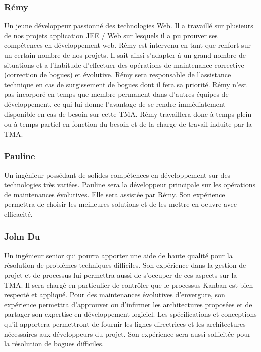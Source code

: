 \subsubsection{Rémy }
Un jeune développeur passionné des technologies Web. Il a travaillé sur plusieurs de nos projets application JEE / Web sur lesquels il a pu prouver ses compétences en développement web. Rémy est intervenu en tant que renfort sur un certain nombre de nos projets. Il sait ainsi s’adapter à un grand nombre de situations et a l’habitude d’effectuer des opérations de maintenance corrective (correction de bogues) et évolutive. Rémy  sera responsable de l’assistance technique en cas de surgissement de bogues dont il fera sa priorité. Rémy n’est pas incorporé en temps que membre permanent dans d’autres équipes de développement, ce qui lui donne l’avantage de se rendre immédiatement disponible en cas de besoin sur cette TMA. Rémy travaillera donc à temps plein ou à temps partiel en fonction du besoin et de la charge de travail induite par la TMA. 

\subsubsection{Pauline }
Un ingénieur possédant de solides compétences en développement sur des technologies très variées. Pauline sera la développeur principale sur les opérations de maintenances évolutives. Elle sera assistée par Rémy. Son expérience permettra de choisir les meilleures solutions et de les mettre en oeuvre avec efficacité. 

\subsubsection{John Du }
Un ingénieur senior qui pourra apporter une aide de haute qualité pour la résolution de problèmes techniques difficiles. Son expérience dans la gestion de projet et de processus lui permettra aussi de s’occuper de ces aspects sur la TMA. Il sera chargé en particulier de contrôler que le processus Kanban est bien respecté et appliqué. Pour des maintenances évolutives d’envergure, son expérience permettra d’approuver ou d’infirmer les architectures proposées et de partager son expertise en développement logiciel. Les spécifications et conceptions qu’il apportera permettront de fournir les lignes directrices et les architectures nécessaires aux développeurs du projet. Son expérience sera aussi sollicitée pour la résolution de bogues difficiles. 

